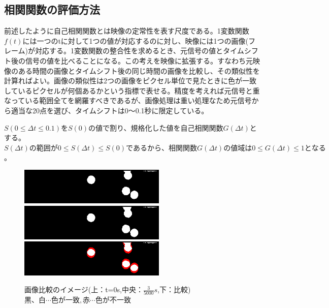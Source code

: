 \documentclass[a4paper,12pt,dvipdfmx]{jsarticle}
\begin{document}
\subsection{相関関数の評価方法}
前述したように自己相関関数とは映像の定常性を表す尺度である。1変数関数$f(t)$には一つのtに対して1つの値が対応するのに対し、映像には1つの画像(フレーム)が対応する。1変数関数の整合性を求めるとき、元信号の値とタイムシフト後の信号の値を比べることになる。この考えを映像に拡張する。すなわち元映像のある時間の画像とタイムシフト後の同じ時間の画像を比較し、その類似性を計算ればよい。画像の類似性は2つの画像をピクセル単位で見たときに色が一致しているピクセルが何個あるかという指標で表せる。精度を考えれば元信号と重なっている範囲全てを網羅すべきであるが、画像処理は重い処理なため元信号から適当な20点を選び、タイムシフトは0〜0.1秒に限定している。

$S(0 \leq \Delta t \leq 0.1)をS(0)$の値で割り、規格化した値を自己相関関数$G(\Delta t)$とする。$S(\Delta t)の範囲が0 \leq S(\Delta t) \leq S(0)であるから、相関関数G(\Delta t)の値域は0 \leq G(\Delta t) \leq 1となる$。
\begin{figure}[hbtp]
	\includegraphics[clip,width=7.0cm]{0.png}
	\includegraphics[clip,width=7.0cm]{3.png}
	\includegraphics[clip,width=7.0cm]{0and3.png}
	\caption{画像比較のイメージ(上：t=0s,中央：$\frac{3}{5000}s$,下：比較) \newline $黒、白 \cdots 色が一致 ,赤 \cdots 色が不一致$}
	\label{fig:exfall}
\end{figure}
\end{document}
